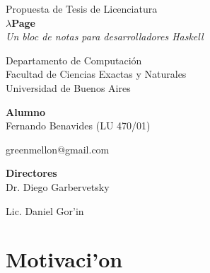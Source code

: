 \documentclass[a4paper]{article}
\begin{document}
	\thispagestyle{empty}
	\begin{center}
	{\Large Propuesta de Tesis de Licenciatura}\\[1em]
	{\huge \textbf{$\lambda$Page}}\\[0.5em]
	{\large \textit{Un bloc de notas para desarrolladores Haskell}}\\[1em]
	\par{}
	{\large Departamento de Computaci\'on}\\[0.5em]
	{\large Facultad de Ciencias Exactas y Naturales}\\[0.5em]
	{\large Universidad de Buenos Aires}
	\par{}
	{\Large \textbf{Alumno}}\\[0.8em]
	{\Large Fernando Benavides (LU 470/01)} \par
	{\Large greenmellon@gmail.com} \par
	\par{}
	{\Large \textbf{Directores}}\\[0.8em]
	{\Large Dr. Diego Garbervetsky} \par
	{\Large Lic. Daniel Gor'in}
	\end{center}

\section{Motivaci'on}
\end{document}
